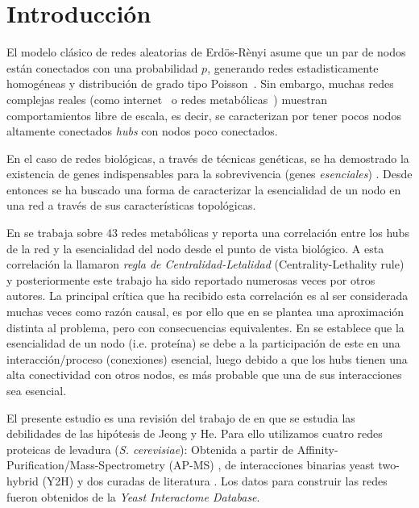 \section{Introducci\'on}
El modelo cl\'asico de redes aleatorias de Erd\"os-R\`enyi asume que un par de 
nodos est\'an conectados con una probabilidad $p$, generando redes estadisticamente
homog\'eneas y distribuci\'on de grado tipo Poisson~\citep{jeong2000}. Sin embargo, 
muchas redes complejas reales (como internet~\citep{faloutsos1999} o 
redes metab\'olicas~\citep{jeong2000}) muestran comportamientos libre de 
escala, es decir, se caracterizan por tener pocos nodos altamente conectados 
\textit{hubs} con nodos poco conectados.

En el caso de redes biol\'ogicas, a trav\'es de t\'ecnicas gen\'eticas, se ha 
demostrado la existencia de genes indispensables para la sobrevivencia (genes
\textit{esenciales}) \citep{kamath2003,winzeler1999}. Desde entonces se ha 
buscado una forma de caracterizar la esencialidad de un nodo en una red a 
trav\'es de sus caracter\'isticas topol\'ogicas.

En \citet{jeong2000} se trabaja sobre 43 redes metab\'olicas y reporta una 
correlaci\'on entre los hubs de la red y la esencialidad del nodo desde 
el punto de vista biol\'ogico. A esta correlaci\'on la llamaron 
\textit{regla de Centralidad-Letalidad} (Centrality-Lethality rule) y 
posteriormente este trabajo ha sido reportado numerosas veces por otros 
autores. La principal cr\'itica que ha recibido esta correlaci\'on es al ser
considerada muchas veces como raz\'on causal, es por ello que en
\citet{he2006} se plantea una aproximaci\'on distinta al problema, pero 
con consecuencias equivalentes. En \citet{he2006} se establece que la
esencialidad de un nodo (i.e. prote\'ina) se debe a la participaci\'on de 
este en una interacci\'on/proceso (conexiones) esencial, luego debido 
a que los hubs tienen una alta conectividad con otros nodos, es m\'as 
probable que una de sus interacciones sea esencial.


El presente estudio es una revisi\'on del trabajo de \citet{zotenko2008} en que 
se estudia las debilidades de las hip\'otesis de Jeong y He. Para ello utilizamos
cuatro redes proteicas de levadura (\textit{S. cerevisiae}): Obtenida a partir 
de Affinity-Purification/Mass-Spectrometry (AP-MS) \citep{apms_data}, de 
interacciones binarias yeast two-hybrid (Y2H) \citep{y2h_data} y dos curadas 
de literatura \citep{lit_data}. Los datos para 
construir las redes fueron obtenidos de la \textit{Yeast Interactome Database}.
